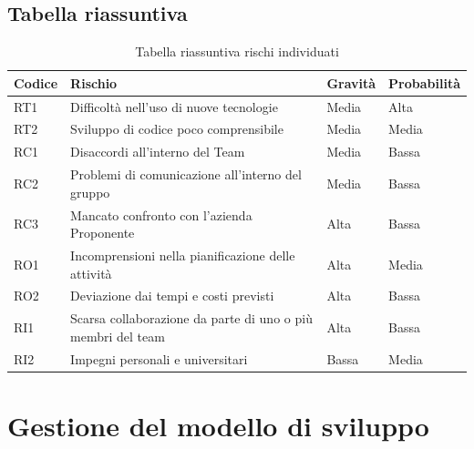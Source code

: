 \documentclass{article}
\begin{document}
    \break
    \subsection{Tabella riassuntiva}
    \begin{table}[H]
        \renewcommand{\arraystretch}{1.5}
        \centering
        \begin{tabular}{|p{1.5cm}|p{10cm}|p{2cm}|p{2cm}|}
            \hline
            \textbf{Codice} & \textbf{Rischio} & \textbf{Gravità} & \textbf{Probabilità} \\
            \hline
            RT1 & Difficoltà nell’uso di nuove tecnologie & Media & Alta \\
            \hline
            RT2 & Sviluppo di codice poco comprensibile & Media & Media \\
            \hline
            RC1 & Disaccordi all’interno del Team & Media & Bassa \\
            \hline
            RC2 & Problemi di comunicazione all’interno del gruppo & Media & Bassa \\
            \hline
            RC3 & Mancato confronto con l’azienda Proponente & Alta & Bassa \\
            \hline
            RO1 & Incomprensioni nella pianificazione delle attività & Alta & Media \\
            \hline
            RO2 & Deviazione dai tempi e costi previsti & Alta & Bassa \\
            \hline
            RI1 & Scarsa collaborazione da parte di uno o più membri del team & Alta & Bassa \\
            \hline
            RI2 & Impegni personali e universitari  & Bassa & Media \\
            \hline
        \end{tabular}
        \caption{Tabella riassuntiva rischi individuati}
    \end{table}





\newpage
\section{Gestione del modello di sviluppo}
\end{document}
